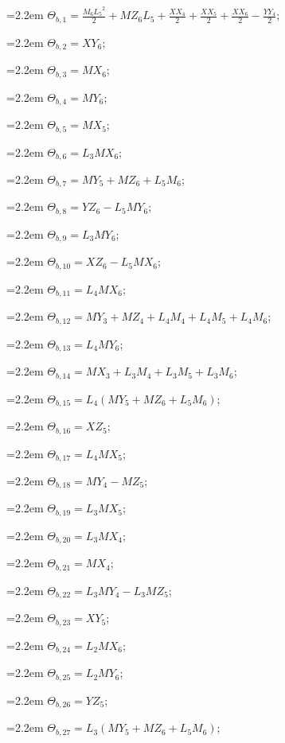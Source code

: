{\small\setlength{\parindent}{0pt}\raggedright
\hangindent=2.2em $\Theta_{b,1}=\tfrac{M_{6}{L_{5}}^2}{2}+MZ_{6}L_{5}+\tfrac{XX_{4}}{2}+\tfrac{XX_{5}}{2}+\tfrac{XX_{6}}{2}-\tfrac{YY_{4}}{2}$;\par
\hangindent=2.2em $\Theta_{b,2}=XY_{6}$;\par
\hangindent=2.2em $\Theta_{b,3}=MX_{6}$;\par
\hangindent=2.2em $\Theta_{b,4}=MY_{6}$;\par
\hangindent=2.2em $\Theta_{b,5}=MX_{5}$;\par
\hangindent=2.2em $\Theta_{b,6}=L_{3}MX_{6}$;\par
\hangindent=2.2em $\Theta_{b,7}=MY_{5}+MZ_{6}+L_{5}M_{6}$;\par
\hangindent=2.2em $\Theta_{b,8}=YZ_{6}-L_{5}MY_{6}$;\par
\hangindent=2.2em $\Theta_{b,9}=L_{3}MY_{6}$;\par
\hangindent=2.2em $\Theta_{b,10}=XZ_{6}-L_{5}MX_{6}$;\par
\hangindent=2.2em $\Theta_{b,11}=L_{4}MX_{6}$;\par
\hangindent=2.2em $\Theta_{b,12}=MY_{3}+MZ_{4}+L_{4}M_{4}+L_{4}M_{5}+L_{4}M_{6}$;\par
\hangindent=2.2em $\Theta_{b,13}=L_{4}MY_{6}$;\par
\hangindent=2.2em $\Theta_{b,14}=MX_{3}+L_{3}M_{4}+L_{3}M_{5}+L_{3}M_{6}$;\par
\hangindent=2.2em $\Theta_{b,15}=L_{4}(MY_{5}+MZ_{6}+L_{5}M_{6})$;\par
\hangindent=2.2em $\Theta_{b,16}=XZ_{5}$;\par
\hangindent=2.2em $\Theta_{b,17}=L_{4}MX_{5}$;\par
\hangindent=2.2em $\Theta_{b,18}=MY_{4}-MZ_{5}$;\par
\hangindent=2.2em $\Theta_{b,19}=L_{3}MX_{5}$;\par
\hangindent=2.2em $\Theta_{b,20}=L_{3}MX_{4}$;\par
\hangindent=2.2em $\Theta_{b,21}=MX_{4}$;\par
\hangindent=2.2em $\Theta_{b,22}=L_{3}MY_{4}-L_{3}MZ_{5}$;\par
\hangindent=2.2em $\Theta_{b,23}=XY_{5}$;\par
\hangindent=2.2em $\Theta_{b,24}=L_{2}MX_{6}$;\par
\hangindent=2.2em $\Theta_{b,25}=L_{2}MY_{6}$;\par
\hangindent=2.2em $\Theta_{b,26}=YZ_{5}$;\par
\hangindent=2.2em $\Theta_{b,27}=L_{3}(MY_{5}+MZ_{6}+L_{5}M_{6})$;\par
}
